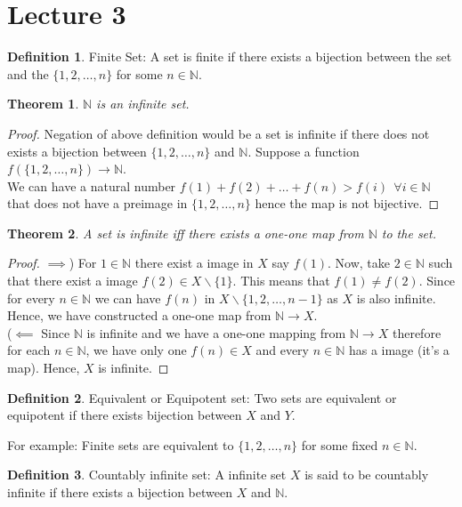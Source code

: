 \documentclass[12pt]{report}
\newtheorem{thm}{Theorem}
\theoremstyle{definition}
\newtheorem{defn}{Definition}
\begin{document}
\section*{Lecture 3}
\begin{defn}
    Finite Set: A set is finite if there exists a bijection between the set and the $\{1,2, \dots, n\}$ for some $n \in \mathbb{N}$.
\end{defn}
\begin{thm}
    $\mathbb{N}$ is an infinite set.
\end{thm}
\begin{proof}
    Negation of above definition would be a set is infinite if there does not exists a bijection between $\{1,2, \dots, n\}$ and $\mathbb{N}$. Suppose a function $f(\{1,2, \dots, n\}) \to \mathbb{N}$. \\
    We can have a natural number $f(1)+f(2)+\dots+f(n) > f(i)~~\forall i \in \mathbb{N}$ that does not have a preimage in $\{1,2, \dots, n\}$ hence the map is not bijective.
\end{proof}
\begin{thm}
    A set is infinite iff there exists a one-one map from $\mathbb{N}$ to the set.
\end{thm}
\begin{proof}
    $\implies$) For $1 \in \mathbb{N}$ there exist a image in $X$ say $f(1)$. Now, take $2 \in \mathbb{N}$ such that there exist a image $f(2) \in X\backslash \{1\}$. This means that $f(1) \neq f(2)$. Since for every $n \in \mathbb{N}$ we can have $f(n)$ in $X\backslash\{1,2, \dots, n-1\}$ as $X$ is also infinite. Hence, we have constructed a one-one map from $\mathbb{N} \to X$.\\
    ($\impliedby$ Since $\mathbb{N}$ is infinite and we have a one-one mapping from $\mathbb{N} \to X$ therefore for each $n \in \mathbb{N}$, we have only one $f(n) \in X$ and every $n \in \mathbb{N}$ has a image (it's a map). Hence, $X$ is infinite.
\end{proof}
\begin{defn}
    Equivalent or Equipotent set: Two sets are equivalent or equipotent if there exists bijection between $X$ and $Y$.
\end{defn}
For example: Finite sets are equivalent to $\{1,2, \dots, n\}$ for some fixed $n \in \mathbb{N}$.
\begin{defn}
    Countably infinite set: A infinite set $X$ is said to be countably infinite if there exists a bijection between $X$ and $\mathbb{N}$. 
\end{defn}
\end{document}
